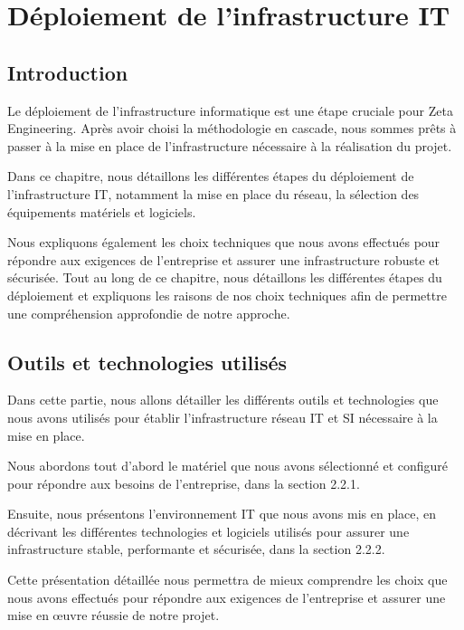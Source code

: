 \chapter{Déploiement de l'infrastructure IT}



\section{Introduction}

Le déploiement de l'infrastructure informatique est une étape cruciale pour  Zeta Engineering. Après avoir choisi la méthodologie en cascade, nous sommes prêts à passer à la mise en place de l'infrastructure nécessaire à la réalisation du projet.

Dans ce chapitre, nous détaillons les différentes étapes du déploiement de l'infrastructure IT, notamment la mise en place du réseau, la sélection des équipements matériels et logiciels.

Nous expliquons également les choix techniques que nous avons effectués pour répondre aux exigences de l'entreprise et assurer une infrastructure robuste et sécurisée. Tout au long de ce chapitre, nous détaillons les différentes étapes du déploiement et expliquons les raisons de nos choix techniques afin de permettre une compréhension approfondie de notre approche.

\section{Outils et technologies utilisés}

Dans cette partie, nous allons détailler les différents outils et technologies que nous avons utilisés pour établir l'infrastructure réseau IT et SI nécessaire à la mise en place.

Nous abordons tout d'abord le matériel que nous avons sélectionné et configuré pour répondre aux besoins de l'entreprise, dans la section 2.2.1.

Ensuite, nous présentons l'environnement IT que nous avons mis en place, en décrivant les différentes technologies et logiciels utilisés pour assurer une infrastructure stable, performante et sécurisée, dans la section 2.2.2.

Cette présentation détaillée nous permettra de mieux comprendre les choix que nous avons effectués pour répondre aux exigences de l'entreprise et assurer une mise en œuvre réussie de notre projet.


